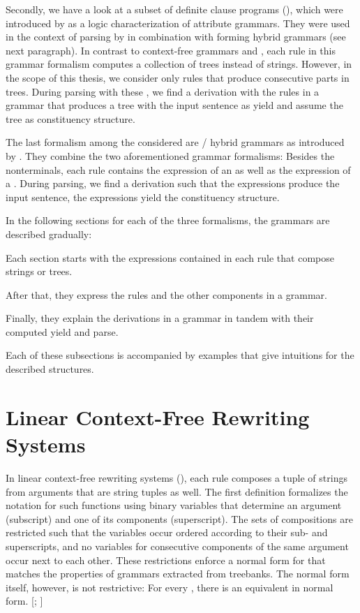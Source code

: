 \documentclass[../document.tex]{subfiles}
\begin{document}
    Secondly, we have a look at a subset of definite clause programs (), which were introduced by \cite{Der85} as a logic characterization of attribute grammars.
    They were used in the context of parsing by \cite{Ned14,Geb17,Geb20} in combination with  forming hybrid grammars (see next paragraph).
    In contrast to context-free grammars and , each rule in this grammar formalism computes a collection of trees instead of strings.
    However, in the scope of this thesis, we consider only  rules that produce consecutive parts in trees.
    During parsing with these , we find a derivation with the rules in a grammar that produces a tree with the input sentence as yield and assume the tree as constituency structure.

    The last formalism among the considered are / hybrid grammars as introduced by \citet{Ned14}.
    They combine the two aforementioned grammar formalisms:
        Besides the nonterminals, each rule contains the expression of an  as well as the expression of a .
    During parsing, we find a derivation such that the  expressions produce the input sentence, the  expressions yield the constituency structure.

    In the following sections for each of the three formalisms, the grammars are described gradually:
    \begin{inparaenum}[(i)]
        \item Each section starts with the expressions contained in each rule that compose strings or trees.
        \item After that, they express the rules and the other components in a grammar.
        \item Finally, they explain the derivations in a grammar in tandem with their computed yield and parse.
    \end{inparaenum}
    Each of these subsections is accompanied by examples that give intuitions for the described structures.

    \section{Linear Context-Free Rewriting Systems}

    In linear context-free rewriting systems (), each rule composes a tuple of strings from arguments that are string tuples as well.
    The first definition formalizes the notation for such functions using binary variables that determine an argument (subscript) and one of its components (superscript).
    The sets of compositions are restricted such that the variables occur ordered according to their sub- and superscripts, and no variables for consecutive components of the same argument occur next to each other.
    These restrictions enforce a normal form for  that matches the properties of grammars extracted from treebanks.
    The normal form itself, however, is not restrictive: For every , there is an equivalent  in normal form. [\citealp[Lem.~2.2]{SekMatFujKas91}; \citealp[Def.~7.2]{Kal10}]
\end{document}
